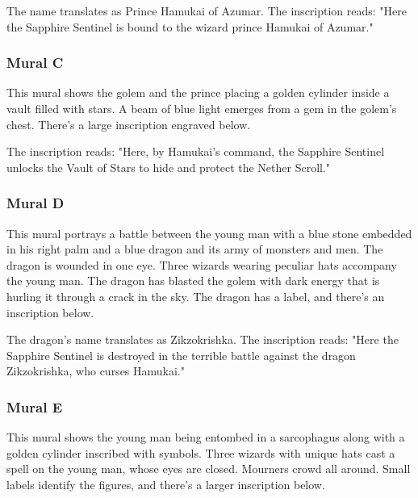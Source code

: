 \documentclass[10pt,a4paper,twoside,bg=print,twocolumn,openany,nodeprecatedcode]{dndbook}
\begin{document}
The name translates as Prince Hamukai of Azumar. The inscription reads: "Here the Sapphire Sentinel is bound to the wizard prince Hamukai of Azumar."

\subsubsection{Mural C}
\begin{DndReadAloud}{}
This mural shows the golem and the prince placing a golden cylinder inside a vault filled with stars. A beam of blue light emerges from a gem in the golem's chest. There's a large inscription engraved below.

\end{DndReadAloud}

The inscription reads: "Here, by Hamukai's command, the Sapphire Sentinel unlocks the Vault of Stars to hide and protect the Nether Scroll."

\subsubsection{Mural D}
\begin{DndReadAloud}{}
This mural portrays a battle between the young man with a blue stone embedded in his right palm and a blue dragon and its army of monsters and men. The dragon is wounded in one eye. Three wizards wearing peculiar hats accompany the young man. The dragon has blasted the golem with dark energy that is hurling it through a crack in the sky. The dragon has a label, and there's an inscription below.

\end{DndReadAloud}

The dragon's name translates as Zikzokrishka. The inscription reads: "Here the Sapphire Sentinel is destroyed in the terrible battle against the dragon Zikzokrishka, who curses Hamukai."

\subsubsection{Mural E}
\begin{DndReadAloud}{}
This mural shows the young man being entombed in a sarcophagus along with a golden cylinder inscribed with symbols. Three wizards with unique hats cast a spell on the young man, whose eyes are closed. Mourners crowd all around. Small labels identify the figures, and there's a larger inscription below.

\end{DndReadAloud}
\end{document}
